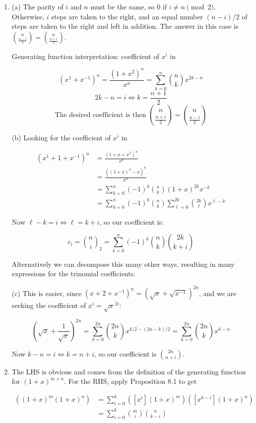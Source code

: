 \documentclass{book}
\numberwithin{equation}{section}
\begin{document}
\begin{enumerate}[label={8.\arabic*}]

\item
(a) The parity of $i$ and $n$ must be the same, so 0 if $i \neq n \pmod{2}$. Otherwise, $i$ steps are taken to the
right, and an equal number $(n-i)/2$ of steps are taken to the right and left in addition. The answer in this case is
${n \choose \frac{n-i}{2}} = {n \choose \frac{n+i}{2}}$.

Generating function interpretation: coefficient of $x^i$ in

$$(x^1 + x^{-1})^n = \frac{(1 + x^2)^n}{x^n} = \sum_{k=0}^n {n \choose k} x^{2k-n}$$
$$2k-n = i \iff k = \frac{n+1}{2}$$
$$\text{The desired coefficient is then } {n \choose \frac{n+i}{2}} = {n \choose \frac{n-i}{2}}$$

(b) Looking for the coefficient of $x^i$ in

\begin{align*}
(x^1 + 1 + x^{-1})^n & = \frac{(1 + x + x^2)^n}{x^n} \\
& = \frac{((1+x)^2 - x)^n}{x^n} \\
& = \sum_{k=0}^n (-1)^k {n \choose k} (1+x)^{2k}x^{-k} \\
& = \sum_{k=0}^n (-1)^k {n \choose k} \sum_{\ell=0}^{2k} {2k \choose \ell}x^{\ell-k}
\end{align*}

Now $\ell-k = i \iff \ell = k + i$, so our coefficient is:

$$c_i = {n \choose i}_2 = \sum_{k=0}^n (-1)^k {n \choose k}{2k \choose k+i}$$

Alternatively we can decompose this many other ways, resulting in many expressions for the trinomial coefficients.

(c) This is easier, since $(x + 2 + x^{-1})^n = (\sqrt{x} + \sqrt{x^{-1}})^{2n}$, and we are seeking the coefficient of
$x^i = \sqrt{x}^{2i}$:

$$\left(\sqrt{x} + \frac{1}{\sqrt{x}}\right)^{2n} = \sum_{k=0}^{2n} {2n \choose k}x^{k/2 - (2n-k)/2} = \sum_{k=0}^{2n} {2n \choose k}x^{k - n}$$

Now $k - n = i \iff k = n+i$, so our coefficient is ${2n \choose n+i}$.

\item
The LHS is obvious and comes from the definition of the generating function for $(1+x)^{m+n}$. For the RHS,
apply Proposition 8.1 to get

\begin{align*}
[x^k]\left( (1+x)^m (1+x)^n \right) & = \sum_{i=0}^k \left( [x^i](1+x)^m \right) \left( [x^{k-i}](1+x)^n \right) \\
& = \sum_{i=0}^k {m \choose i}{n \choose k-i}
\end{align*}


\end{enumerate}
\end{document}
